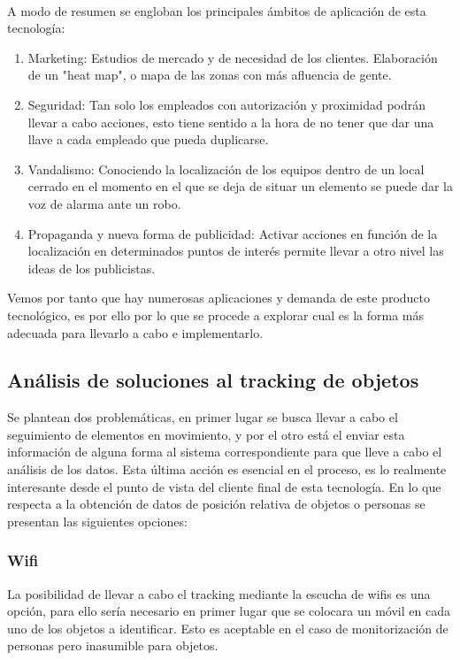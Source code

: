 \documentclass[a4paper ,12pt, onecolumn]{article}
\begin{document}
        \paragraph{}
        A modo de resumen se engloban los principales ámbitos de aplicación de esta tecnología:
        \begin{enumerate}
            \item Marketing: Estudios de mercado y de necesidad de los clientes. Elaboración de un "heat map", o mapa 
            de las zonas con más afluencia de gente.
            \item Seguridad: Tan solo los empleados con autorización y proximidad podrán llevar a cabo acciones,
            esto tiene sentido a la hora de no tener que dar una llave a cada empleado que pueda duplicarse.
            \item Vandalismo: Conociendo la localización de los equipos dentro de un local cerrado en el momento 
            en el que se deja de situar un elemento se puede dar la voz de alarma ante un robo.
            \item Propaganda y nueva forma de publicidad: Activar acciones en función de la localización en determinados
            puntos de interés permite llevar a otro nivel las ideas de los publicistas.
        \end{enumerate}
        Vemos por tanto que hay numerosas aplicaciones y demanda de este producto tecnológico, es por ello por lo que se 
        procede a explorar cual es la forma más adecuada para llevarlo a cabo e implementarlo.
    \subsection{Análisis de soluciones al tracking de objetos}
        Se plantean dos problemáticas, en primer lugar se busca llevar a cabo el seguimiento de elementos en movimiento, y por el otro 
        está el enviar esta información de alguna forma al sistema correspondiente para que lleve a cabo el análisis de los datos. Esta
        última acción es esencial en el proceso, es lo realmente interesante desde el punto de vista del cliente final de esta tecnología.
        En lo que respecta a la obtención de datos de posición relativa de objetos o personas se presentan las siguientes opciones:
        \subsubsection {Wifi}
            La posibilidad de llevar a cabo el tracking mediante la escucha de wifis es una opción, para ello sería
            necesario en primer lugar que se colocara un móvil en cada uno de los objetos a identificar. Esto es aceptable 
            en el caso de monitorización de personas pero inasumible para objetos.
\end{document}
